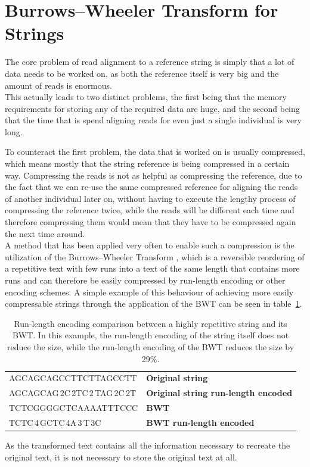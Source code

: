 \documentclass[a4paper,12pt,twoside,BCOR=10mm]{scrbook}
\begin{document}
\section{Burrows--Wheeler Transform for Strings}

The core problem of read alignment to a reference string is simply that a 
lot of data needs to be worked on, as both the reference itself is very big 
and the amount of reads is enormous. \\
This actually leads to two distinct problems, the first being that the 
memory requirements for storing any of the required data are huge, 
and the second being that the time that is spend aligning reads for 
even just a single individual is very long.

To counteract the first problem, the data that is worked on is usually compressed, 
which means mostly that the string reference is being compressed in a certain way. 
Compressing the reads is not as helpful as compressing the reference, 
due to the fact that we can re-use the same compressed reference for aligning the 
reads of another individual later on, without having to execute the lengthy 
process of compressing the reference twice, while the reads will be different 
each time and therefore compressing them would mean that they have to be compressed again the next time around. \\
A method that has been applied very often to enable such a compression is the utilization of the 
Burrows--Wheeler Transform \citep{Burrows1994}, which 
is a reversible reordering of a 
repetitive text with few runs into a text of the same length that contains more runs 
and can therefore be easily compressed by run-length encoding or other encoding schemes. 
A simple example of this behaviour of achieving more easily compressable strings through the application of the BWT 
can be seen in table~\ref{table:evo_background_bwt_run_enc}. 
\begin{table}[htb]
\centering
\caption[Run-length encoding comparison between a repetitive string and its BWT]{Run-length encoding comparison between a highly repetitive string and its BWT. In this example, the run-length encoding of the string itself does not reduce the size, while the run-length encoding of the BWT reduces the size by 29\%.}
   \begin{tabularx}{\textwidth}{ | X | X | }
   \hline
   AGCAGCAGCCTTCTTAGCCTT & \textbf{Original string} \\
   AGCAGCAG\,2C\,2TC\,2\,TAG\,2C\,2T & \textbf{Original string run-length encoded} \\
   \hline
   TCTCGGGGCTCAAAATTTCCC & \textbf{BWT} \\
   TCTC\,4\,GCTC\,4A\,3\,T\,3C & \textbf{BWT run-length encoded} \\
   \hline
   \end{tabularx}
\label{table:evo_background_bwt_run_enc}
\end{table}
As the transformed text contains all the information necessary to recreate the 
original text, it is not necessary to store the original text at all.
\end{document}
